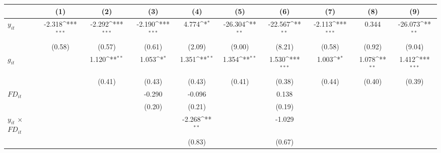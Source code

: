 \documentclass[12pt, a4paper]{article}
\begin{document}
	\begin{table}[htbp]
	\centering
	\scriptsize
	\setlength\tabcolsep{1pt}	
	\begin{threeparttable}
		{
			\def\sym#1{\ifmmode^{#1}\else\(^{#1}\)\fi}
			\begin{tabular}{l*{9}{c}}
				\hline\hline
				&\multicolumn{1}{c}{(1)}&\multicolumn{1}{c}{(2)}&\multicolumn{1}{c}{(3)}&\multicolumn{1}{c}{(4)}&\multicolumn{1}{c}{(5)}&\multicolumn{1}{c}{(6)}&\multicolumn{1}{c}{(7)}&\multicolumn{1}{c}{(8)}&\multicolumn{1}{c}{(9)}\\
				\hline
				$y_{it}$               &      -2.318\sym{***}&      -2.292\sym{***}&      -2.190\sym{***}&       4.774\sym{*}  &     -26.304\sym{**} &     -22.567\sym{**} &      -2.113\sym{***}&       0.344         &     -26.073\sym{**} \\
				&      (0.58)         &      (0.57)         &      (0.61)         &      (2.09)         &      (9.00)         &      (8.21)         &      (0.58)         &      (0.92)         &      (9.04)         \\
				$g_{it}$              &                     &       1.120\sym{**} &       1.053\sym{*}  &       1.351\sym{**} &       1.354\sym{**} &       1.530\sym{***}&       1.003\sym{*}  &       1.078\sym{**} &       1.412\sym{***}\\
				&                     &      (0.41)         &      (0.43)         &      (0.43)         &      (0.41)         &      (0.38)         &      (0.44)         &      (0.40)         &      (0.39)         \\
				$FD_{it}$                &                     &                     &      -0.290         &      -0.096         &                     &       0.138         &                     &                     &                     \\
				&                     &                     &      (0.20)         &      (0.21)         &                     &      (0.19)         &                     &                     &                     \\
				$y_{it}$ $\times$ $FD_{it}$ &                     &                     &                     &      -2.268\sym{**} &                     &      -1.029         &                     &                     &                     \\
				&                     &                     &                     &      (0.83)         &                     &      (0.67)         &                     &                     &                     \\

\end{tabular}}
\end{threeparttable}
\end{table}
\end{document}
